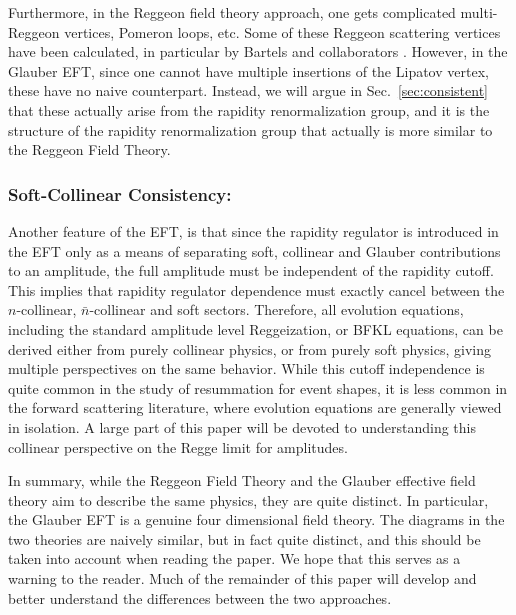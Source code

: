 \documentclass[letterpaper,11pt]{article}
\DeclareRobustCommand{\Sec}[1]{Sec.~\ref{#1}}
\begin{document}
Furthermore, in the Reggeon field theory approach, one gets complicated multi-Reggeon vertices, Pomeron loops, etc. Some of these Reggeon scattering vertices have been calculated, in particular by Bartels and collaborators \cite{Bartels:1978fc,Bartels:1980pe,Bartels:1991bh,Bartels:1994jj,Bartels:1999aw,Bartels:2002au,Bartels:2004hb,Bartels:2007dm,Bartels:2015gou,Bartels:2017nxb}. However, in the Glauber EFT, since one cannot have multiple insertions of the Lipatov vertex, these have no naive counterpart. Instead, we will argue in \Sec{sec:consistent} that these actually arise from the rapidity renormalization group, and it is the structure of the rapidity renormalization group that actually is more similar to the Reggeon Field Theory.

\subsubsection*{Soft-Collinear Consistency:}

Another feature of the EFT, is that since the rapidity regulator is introduced in the EFT only as a means of separating soft, collinear and Glauber contributions to an amplitude, the full amplitude must be independent of the rapidity cutoff. This implies that rapidity regulator dependence must exactly cancel between the $n$-collinear, $\bar n$-collinear and soft sectors. Therefore, all evolution equations, including the standard amplitude level Reggeization, or BFKL equations, can be derived either from purely collinear physics, or from purely soft physics, giving multiple perspectives on the same behavior. While this cutoff independence is quite common in the study of resummation for event shapes, it is less common in the forward scattering literature, where evolution equations are generally viewed in isolation. A large part of this paper will be devoted to understanding this collinear perspective on the Regge limit for amplitudes.

In summary, while the Reggeon Field Theory and the Glauber effective field theory aim to describe the same physics, they are quite distinct. In particular, the Glauber EFT is a genuine four dimensional field theory. The diagrams in the two theories are naively similar, but in fact quite distinct, and this should be taken into account when reading the paper. We hope that this serves as a warning to the reader. Much of the remainder of this paper will develop and better understand the differences between the two approaches.
\end{document}
